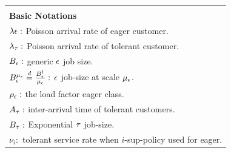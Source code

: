 

\begin{table}[]
	\begin{center}
		\begin{tabular}{|l|}
			\hline
			\\
			\centerline{\bf Basic Notations}
            \\	\hline \hline
			${\lambda\epsilon}:$   Poisson arrival  rate of eager customer.
			\\ \hline
			$\lambda_{\tau} :$ Poisson arrival rate of tolerant customer. 
			\\ \hline
			$B_{ \epsilon } :$  generic ${ \epsilon }$ job size. 
			\\ \hline 
			$B_{ \epsilon }^{\mu_\epsilon} \stackrel{d}{=} \frac{B_{ \epsilon }^1}{{\mu_\epsilon}} :$ ${ \epsilon }$ job-size at scale ${\mu_\epsilon}$.
			\\ \hline
			$\rho_{{ \epsilon }} :$  the load factor eager class.   
			\\ \hline 
			$A_{\tau} :$ inter-arrival time of tolerant customers.
			\\ \hline
			$B_{\tau} :$   Exponential  ${\tau}$ job-size. 
		    \\ \hline
			$\nu_i :$ tolerant service rate when $i$-sup-policy used for eager. 
			\\ \hline
			

\end{tabular}
\end{center}
\end{table}
